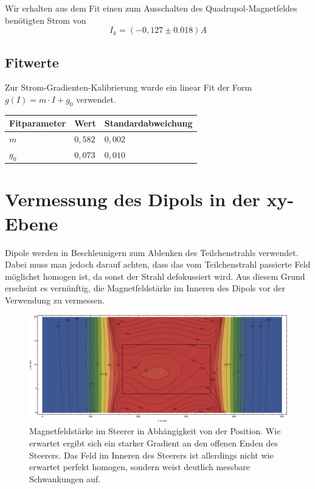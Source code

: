 \documentclass[bigchapter,colorback,accentcolor=tud4b,linedtoc,11pt]{tudreport}
\begin{document}
Wir erhalten aus dem Fit einen zum Ausschalten des Quadrupol-Magnetfeldes benötigten Strom von $$I_k=(-0,127 \pm 0.018)A$$
\subsection{Fitwerte}

Zur Strom-Gradienten-Kalibrierung wurde ein linear Fit der Form $g(I) = m \cdot I + g_0$ verwendet.
\begin{center}
  \begin{tabular}{|p{2.6cm}|p{2.6cm}|p{3.5cm}|}
    \hline
    Fitparameter & Wert    & Standardabweichung \\ \hline
    $m$          & $0,582$ & $0,002$            \\ \hline
    $g_0$        & $0,073$ & $0,010$            \\ \hline
	\end{tabular}
\end{center}

\clearpage{}
\section{Vermessung des Dipols in der xy-Ebene}

Dipole werden in Beschleunigern zum Ablenken des Teilchenstrahls verwendet. Dabei muss man jedoch darauf achten, dass das vom Teilchenstrahl passierte Feld möglichst homogen ist, da sonst der Strahl defokussiert wird. Aus diesem Grund erscheint es vernünftig, die Magnetfeldstärke im Inneren des Dipols vor der Verwendung zu vermessen.

\begin{figure}[H]
\centering
\includegraphics[width=1\textwidth]{img/steererxy.png}
\caption{Magnetfeldstärke im Steerer in Abhängigkeit von der Position. Wie erwartet ergibt sich ein starker Gradient an den offenen Enden des Steerers. Das Feld im Inneren des Steerers ist allerdings nicht wie erwartet perfekt homogen, sondern weist deutlich messbare Schwankungen auf.}
\end{figure}
\end{document}
